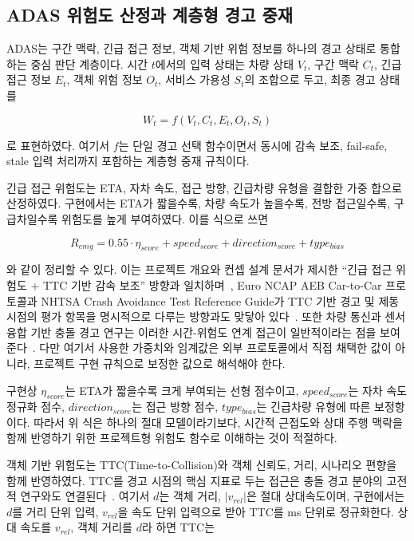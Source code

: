 \documentclass[11pt,a4paper]{article}
\begin{document}
\subsection{ADAS 위험도 산정과 계층형 경고 중재}

ADAS는 구간 맥락, 긴급 접근 정보, 객체 기반 위험 정보를 하나의 경고 상태로 통합하는 중심 판단 계층이다. 시간 $t$에서의 입력 상태는 차량 상태 $V_t$, 구간 맥락 $C_t$, 긴급 접근 정보 $E_t$, 객체 위험 정보 $O_t$, 서비스 가용성 $S_t$의 조합으로 두고, 최종 경고 상태를

\[
W_t=f(V_t,C_t,E_t,O_t,S_t)
\]

로 표현하였다. 여기서 $f$는 단일 경고 선택 함수이면서 동시에 감속 보조, fail-safe, stale 입력 처리까지 포함하는 계층형 중재 규칙이다.

긴급 접근 위험도는 ETA, 자차 속도, 접근 방향, 긴급차량 유형을 결합한 가중 합으로 산정하였다. 구현에서는 ETA가 짧을수록, 차량 속도가 높을수록, 전방 접근일수록, 구급차일수록 위험도를 높게 부여하였다. 이를 식으로 쓰면

\[
R_{emg}=0.55\cdot \eta_{score}+speed_{score}+direction_{score}+type_{bias}
\]

와 같이 정리할 수 있다. 이는 프로젝트 개요와 컨셉 설계 문서가 제시한 ``긴급 접근 위험도 + TTC 기반 감속 보조'' 방향과 일치하며~\cite{proj_overview,concept_design}, Euro NCAP AEB Car-to-Car 프로토콜과 NHTSA Crash Avoidance Test Reference Guide가 TTC 기반 경고 및 제동 시점의 평가 항목을 명시적으로 다루는 방향과도 맞닿아 있다~\cite{euroncap_aeb,nhtsa_crash_avoidance}. 또한 차량 통신과 센서 융합 기반 충돌 경고 연구는 이러한 시간-위험도 연계 접근이 일반적이라는 점을 보여준다~\cite{sensors_v2x_collision}. 다만 여기서 사용한 가중치와 임계값은 외부 프로토콜에서 직접 채택한 값이 아니라, 프로젝트 구현 규칙으로 보정한 값으로 해석해야 한다.

구현상 $\eta_{score}$는 ETA가 짧을수록 크게 부여되는 선형 점수이고, $speed_{score}$는 자차 속도 정규화 점수, $direction_{score}$는 접근 방향 점수, $type_{bias}$는 긴급차량 유형에 따른 보정항이다. 따라서 위 식은 하나의 절대 모델이라기보다, 시간적 근접도와 상대 주행 맥락을 함께 반영하기 위한 프로젝트형 위험도 함수로 이해하는 것이 적절하다.

객체 기반 위험도는 TTC(Time-to-Collision)와 객체 신뢰도, 거리, 시나리오 편향을 함께 반영하였다. TTC를 경고 시점의 핵심 지표로 두는 접근은 충돌 경고 분야의 고전적 연구와도 연결된다~\cite{kiefer_ttc}. 여기서 $d$는 객체 거리, $|v_{rel}|$은 절대 상대속도이며, 구현에서는 $d$를 거리 단위 입력, $v_{rel}$을 속도 단위 입력으로 받아 TTC를 ms 단위로 정규화한다. 상대 속도를 $v_{rel}$, 객체 거리를 $d$라 하면 TTC는
\end{document}
